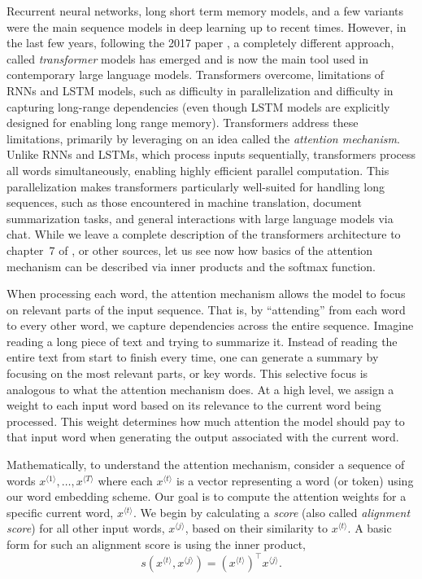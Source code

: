 \documentclass[12pt]{article}
\begin{document}
Recurrent neural networks, long short term memory models, and a few variants were the main sequence models in deep learning up to recent times. However, in the last few years, following the 2017 paper \cite{vaswani2017attention}, a completely different approach, called {\em transformer} models has emerged and is now the main tool used in contemporary large language models. Transformers overcome, limitations of RNNs and LSTM models, such as difficulty in parallelization and difficulty in capturing long-range dependencies (even though LSTM models are explicitly designed for enabling long range memory). Transformers address these limitations, primarily by leveraging on an idea called the {\em attention mechanism}. Unlike RNNs and LSTMs, which process inputs sequentially, transformers process all words simultaneously, enabling highly efficient parallel computation. This parallelization makes transformers particularly well-suited for handling long sequences, such as those encountered in machine translation, document summarization tasks, and general interactions with large language models via chat. While we leave a complete description of the transformers architecture to  chapter~7 of \cite{LiquetMokaNazarathy2024DeepLearning}, or other sources, let us see now how basics of the attention mechanism can be described via inner products and the softmax function.

When processing each word, the attention mechanism allows the model to focus on relevant parts of the input sequence. That is, by ``attending'' from each word to every other word, we capture dependencies across the entire sequence. Imagine reading a long piece of text and trying to summarize it. Instead of reading the entire text from start to finish every time, one can generate a summary by focusing on the most relevant parts, or key words. This selective focus is analogous to what the attention mechanism does. At a high level, we assign a weight to each input word based on its relevance to the current word being processed. This weight determines how much attention the model should pay to that input word when generating the output associated with the current word. 

Mathematically, to understand the attention mechanism, consider a sequence of words $x^{{\langle 1 \rangle}},\ldots, x^{{\langle T \rangle}}$ where each $x^{{\langle t \rangle}}$ is a vector representing a word (or token) using our word embedding scheme. Our goal is to compute the attention weights for a specific current word, $x^{{\langle t \rangle}}$. %
We begin by calculating a {\em score} (also called {\em alignment score}) for all other input words, $x^{{\langle j \rangle}}$,  based on their similarity to $x^{{\langle t \rangle}}$. A basic form for such an alignment score is using the inner product,
%
\begin{equation}
\label{eq:score}
s(x^{{\langle t \rangle}},x^{{\langle j \rangle}})=(x^{{\langle t \rangle}})^\top x^{{\langle j \rangle}}.%
\end{equation}
\end{document}
